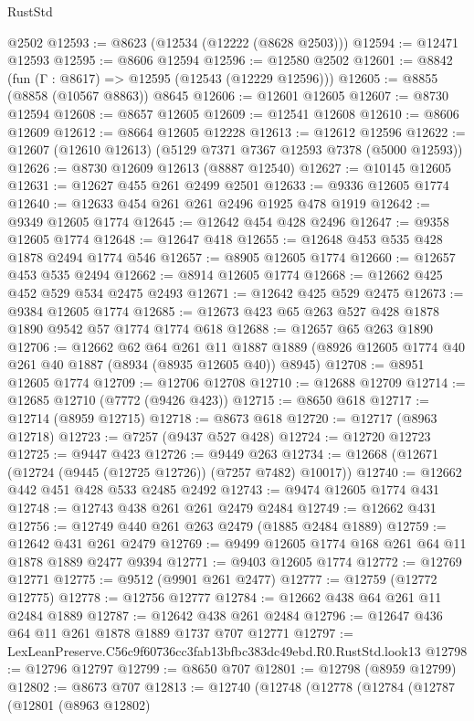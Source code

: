 \begin{lexlean}{RustStd}
\begin{coremodule}
    @2502
@12593 := @8623 (@12534 (@12222 (@8628 @2503)))
@12594 := @12471 @12593
@12595 := @8606 @12594
@12596 := @12580 @2502
@12601 := @8842 (fun (Γ : @8617) => @12595 (@12543 (@12229 @12596)))
@12605 := @8855 (@8858 (@10567 @8863)) @8645
@12606 := @12601 @12605
@12607 := @8730 @12594
@12608 := @8657 @12605
@12609 := @12541 @12608
@12610 := @8606 @12609
@12612 := @8664 @12605 @12228
@12613 := @12612 @12596
@12622 := @12607 (@12610 @12613) (@5129 @7371 @7367 @12593 @7378 (@5000 @12593))
@12626 := @8730 @12609 @12613 (@8887 @12540)
@12627 := @10145 @12605
@12631 := @12627 @455 @261 @2499 @2501
@12633 := @9336 @12605 @1774
@12640 := @12633 @454 @261 @261 @2496 @1925 @478 @1919
@12642 := @9349 @12605 @1774
@12645 := @12642 @454 @428 @2496
@12647 := @9358 @12605 @1774
@12648 := @12647 @418
@12655 := @12648 @453 @535 @428 @1878 @2494 @1774 @546
@12657 := @8905 @12605 @1774
@12660 := @12657 @453 @535 @2494
@12662 := @8914 @12605 @1774
@12668 := @12662 @425 @452 @529 @534 @2475 @2493
@12671 := @12642 @425 @529 @2475
@12673 := @9384 @12605 @1774
@12685 := @12673 @423 @65 @263 @527 @428 @1878 @1890 @9542 @57 @1774 @1774 @618
@12688 := @12657 @65 @263 @1890
@12706 := @12662
    @62
    @64
    @261
    @11
    @1887
    @1889
    (@8926 @12605 @1774 @40 @261 @40 @1887 (@8934 (@8935 @12605 @40)) @8945)
@12708 := @8951 @12605 @1774
@12709 := @12706 @12708
@12710 := @12688 @12709
@12714 := @12685 @12710 (@7772 (@9426 @423))
@12715 := @8650 @618
@12717 := @12714 (@8959 @12715)
@12718 := @8673 @618
@12720 := @12717 (@8963 @12718)
@12723 := @7257 (@9437 @527 @428)
@12724 := @12720 @12723
@12725 := @9447 @423
@12726 := @9449 @263
@12734 := @12668 (@12671 (@12724 (@9445 (@12725 @12726)) (@7257 @7482) @10017))
@12740 := @12662 @442 @451 @428 @533 @2485 @2492
@12743 := @9474 @12605 @1774 @431
@12748 := @12743 @438 @261 @261 @2479 @2484
@12749 := @12662 @431
@12756 := @12749 @440 @261 @263 @2479 (@1885 @2484 @1889)
@12759 := @12642 @431 @261 @2479
@12769 := @9499 @12605 @1774 @168 @261 @64 @11 @1878 @1889 @2477 @9394
@12771 := @9403 @12605 @1774
@12772 := @12769 @12771
@12775 := @9512 (@9901 @261 @2477)
@12777 := @12759 (@12772 @12775)
@12778 := @12756 @12777
@12784 := @12662 @438 @64 @261 @11 @2484 @1889
@12787 := @12642 @438 @261 @2484
@12796 := @12647 @436 @64 @11 @261 @1878 @1889 @1737 @707 @12771
@12797 := LexLeanPreserve.C56c9f60736cc3fab13bfbc383dc49ebd.R0.RustStd.look13
@12798 := @12796 @12797
@12799 := @8650 @707
@12801 := @12798 (@8959 @12799)
@12802 := @8673 @707
@12813 := @12740
    (@12748
      (@12778
        (@12784
          (@12787
            (@12801
              (@8963 @12802)

\end{coremodule}
\end{lexlean}
